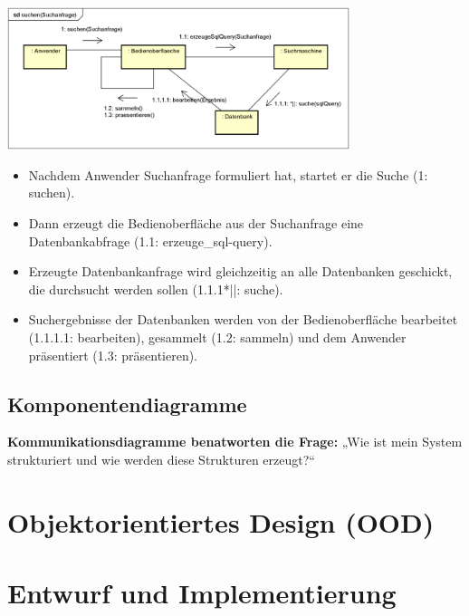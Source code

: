 \documentclass[11pt, a4paper]{article}
\begin{document}
\centering \includegraphics[width=0.75\textwidth]{Kommunikation-01.png}

\tiny
\begin{itemize}
    \item Nachdem Anwender Suchanfrage formuliert hat, startet er die Suche (1: suchen).
    \item Dann erzeugt die Bedienoberfläche aus der Suchanfrage eine Datenbankabfrage (1.1: erzeuge\_sql-query).
    \item Erzeugte Datenbankanfrage wird gleichzeitig an alle Datenbanken geschickt, die durchsucht werden sollen (1.1.1*||: suche).
    \item Suchergebnisse der Datenbanken werden von der Bedienoberfläche bearbeitet (1.1.1.1: bearbeiten), gesammelt (1.2: sammeln) und dem Anwender präsentiert (1.3: präsentieren).
\end{itemize}


\newpage



\raggedright \subsection{Komponentendiagramme}



\textbf{Kommunikationsdiagramme benatworten die Frage:} „Wie ist mein System strukturiert und wie werden diese Strukturen erzeugt?“




\section{Objektorientiertes Design (OOD)} %


\section{Entwurf und Implementierung} %
\end{document}
